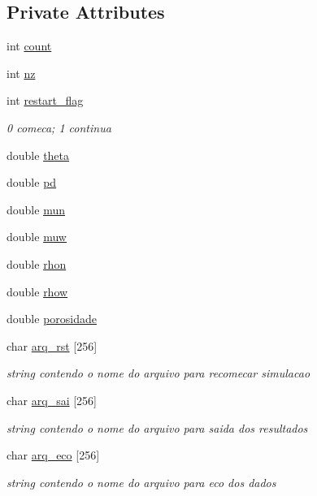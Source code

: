 \subsection*{Private Attributes}
\begin{DoxyCompactItemize}
\item 
int \hyperlink{classDG__Prob_a638611f0f0a04508f43ac7554bc8c7e2}{count}
\item 
int \hyperlink{classDG__Prob_a18aa37594c06d6a879fad8d06f1950d1}{nz}
\item 
int \hyperlink{classDG__Prob_ab91c87bf52e188499511bc8161a1ac88}{restart\+\_\+flag}
\begin{DoxyCompactList}\small\item\em 0 comeca; 1 continua \end{DoxyCompactList}\item 
double \hyperlink{classDG__Prob_a652258d60768a84ea2867c94246f3323}{theta}
\item 
double \hyperlink{classDG__Prob_a5c6b1eeb7d2986b650fa16b90a07dae8}{pd}
\item 
double \hyperlink{classDG__Prob_a5a78a8cf11b3dd9553a5f9385636610b}{mun}
\item 
double \hyperlink{classDG__Prob_af0f93772b9aec2a1500a1443d2dc7a00}{muw}
\item 
double \hyperlink{classDG__Prob_a0eadc4c74c80d41d7bd7baee54d6f98d}{rhon}
\item 
double \hyperlink{classDG__Prob_a067b5b8e0add791484c168020e960401}{rhow}
\item 
double \hyperlink{classDG__Prob_a25479007d2b47d2601d831d6fdf0a77e}{porosidade}
\item 
char \hyperlink{classDG__Prob_a09bc7ed787088a22a4e0707550d747a4}{arq\+\_\+rst} \mbox{[}256\mbox{]}
\begin{DoxyCompactList}\small\item\em string contendo o nome do arquivo para recomecar simulacao \end{DoxyCompactList}\item 
char \hyperlink{classDG__Prob_a5c02458978efbc0a34e34e0d7f98290b}{arq\+\_\+sai} \mbox{[}256\mbox{]}
\begin{DoxyCompactList}\small\item\em string contendo o nome do arquivo para saida dos resultados \end{DoxyCompactList}\item 
char \hyperlink{classDG__Prob_a42e2ae0c75d2745012cd74f276b600a0}{arq\+\_\+eco} \mbox{[}256\mbox{]}
\begin{DoxyCompactList}\small\item\em string contendo o nome do arquivo para eco dos dados \end{DoxyCompactList}\item 

\end{DoxyCompactItemize}
